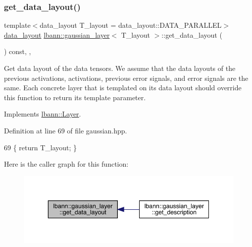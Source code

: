 \subsubsection{\texorpdfstring{get\+\_\+data\+\_\+layout()}{get\_data\_layout()}}
{\footnotesize\ttfamily template$<$data\+\_\+layout T\+\_\+layout = data\+\_\+layout\+::\+D\+A\+T\+A\+\_\+\+P\+A\+R\+A\+L\+L\+EL$>$ \\
\hyperlink{base_8hpp_a786677cbfb3f5677b4d84f3056eb08db}{data\+\_\+layout} \hyperlink{classlbann_1_1gaussian__layer}{lbann\+::gaussian\+\_\+layer}$<$ T\+\_\+layout $>$\+::get\+\_\+data\+\_\+layout (\begin{DoxyParamCaption}{ }\end{DoxyParamCaption}) const\hspace{0.3cm}{\ttfamily [inline]}, {\ttfamily [override]}, {\ttfamily [virtual]}}

Get data layout of the data tensors. We assume that the data layouts of the previous activations, activations, previous error signals, and error signals are the same. Each concrete layer that is templated on its data layout should override this function to return its template parameter. 

Implements \hyperlink{classlbann_1_1Layer_a5dfb66e81fc085997402a5e2241316bd}{lbann\+::\+Layer}.



Definition at line 69 of file gaussian.\+hpp.


\begin{DoxyCode}
69 \{ \textcolor{keywordflow}{return} T\_layout; \}
\end{DoxyCode}
Here is the caller graph for this function\+:\nopagebreak
\begin{figure}[H]
\begin{center}
\leavevmode
\includegraphics[width=343pt]{classlbann_1_1gaussian__layer_a79dce69c1a681b66849423329f84df30_icgraph}
\end{center}
\end{figure}
\mbox{\label{classlbann_1_1gaussian__layer_a0a062897d0660c9a494c98d800aac9e9}} 
